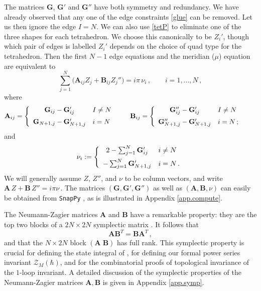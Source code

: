 \documentclass[12pt]{amsart}
\newcommand{\lbl}{\label}
\renewcommand{\eta}{\nu}
\theoremstyle{definition}
\def\be{  \begin{equation} }
\def\ee{  \end{equation} }
\newcommand{\CZ}{\mathcal{Z}}
\newcommand{\mb}{\mathbf}
\numberwithin{equation}{section}
\begin{document}
The matrices $\mb G$, $\mb G'$ and $\mb G''$ %
have both symmetry and  
redundancy. We have already observed that any one of the edge 
constraints \eqref{glue} can be removed. Let us then ignore the  
edge $I=N$. We can also use \eqref{tetP} to eliminate one of the three 
shapes for each tetrahedron. We choose this canonically to be $Z_i'$,
though which pair of edges is labelled $Z_i'$ depends on the choice of 
quad type for the tetrahedron. Then the first $N-1$ edge equations 
and the meridian ($\mu$) equation are equivalent to
%
\be 
\sum_{j=1}^N \big(\mb A_{ij}Z_j+\mb B_{ij}Z_j''\big) = i\pi\, \eta_i\,,
\qquad i=1,...,N\,, 
\lbl{NZlin} 
\ee
%
where 
%
\be
 \mb A_{ij} = \left\{\begin{array}{c@{\quad}l}
  \mb G_{ij}-\mb G_{ij}' & I\neq N \\[.2cm]
    \mb G_{N+1,j}-\mb G_{N+1,j}' & i= N
  \end{array}\right. \qquad
  \mb B_{ij} = \left\{\begin{array}{c@{\quad}l}
  \mb G_{ij}''-\mb G_{ij}' & I\neq N \\[.2cm]
    \mb G_{N+1,j}''-\mb G_{N+1,j}' & i= N\,;
  \end{array}\right. \qquad
\ee
%
and
%
\be \eta_i := \left\{\begin{array}{c@{\quad}l}
  2-\sum_{j=1}^N \mb G_{ij}' & i\neq N \\[.2cm]
    -\sum_{j=1}^N \mb G_{N+1,j}' & i= N\,.
  \end{array}\right.
\lbl{defn}
\ee
%
We will generally assume $Z$, $Z''$, and $\eta$ to be column vectors, 
and write %
$ \mb A\, Z+\mb B \,Z''=i\pi \eta\,.$
%
The matrices $(\mb G,\mb G',\mb G'')$ as well as
$(\mb A, \mb B,\eta)$ can easily be obtained from \texttt{SnapPy} 
\cite{SnapPy}, as is illustrated in Appendix \ref{app.compute}.

The Neumann-Zagier matrices $\mb A$ and $\mb B$ have a remarkable property: 
they are the top 
two blocks of a $2N\times 2N$ symplectic matrix \cite{NZ}. It follows that
%
\be \mb A\mb B^T = \mb B\mb A^T \,, 
\lbl{NZsymp} \ee
%
and that the $N\times 2N$ block $(\mb A\;\mb B)$ has full rank. This 
symplectic property is crucial for defining the state integral of \cite{D1},
for defining our formal power series invariant $\CZ_M(\hbar)$, and for the 
combinatorial proofs of topological invariance of the $1$-loop invariant.
A detailed discussion of the symplectic properties of the Neumann-Zagier
matrices $\mb A, \mb B$ is given in Appendix \ref{app.symp}.
\end{document}
